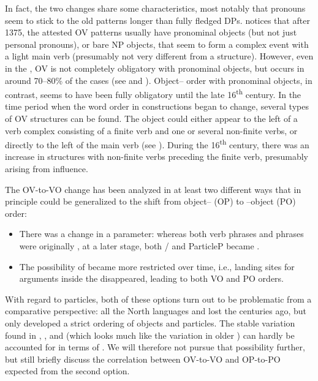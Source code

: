 \documentclass[output=paper]{langscibook}
\begin{document}
In fact, the two changes share some characteristics, most notably that pronouns seem to stick to the old patterns longer than fully fledged DPs. \citet[174]{Delsing1999} notices that after 1375, the attested OV patterns usually have pronominal objects (but not just personal pronouns), or bare NP objects, that seem to form a complex event with a light main verb (presumably not very different from a  structure). However, even in the , OV is not completely obligatory with pronominal objects, but occurs in around 70–80\% of the cases (see \citealt{Delsing1999} and ). Object– order with pronominal objects, in contrast, seems to have been fully obligatory until the late 16\textsuperscript{th} century. In the time period when the word order in  constructions began to change, several types of OV structures can be found. The object could either appear to the left of a verb complex consisting of a finite verb and one or several non-finite verbs, or directly to the left of the main verb (see \citealt{Petzell2011, Petzell2012}). During the 16\textsuperscript{th} century, there was an increase in structures with non-finite verbs preceding the finite verb, presumably arising from  influence.



The OV-to-VO change has been analyzed in at least two different ways that in principle could be generalized to the shift from object– (OP) to –object (PO) order: 


\begin{itemize}
\item There was a change in a  parameter: whereas both verb phrases and  phrases were originally , at a later stage, both / and ParticleP became .
\item The possibility of  became more restricted over time, i.e., landing sites for arguments inside the  disappeared, leading to both VO and PO orders.
\end{itemize}

With regard to particles, both of these options turn out to be problematic from a comparative perspective: all the North  languages and  lost the  centuries ago, but only  developed a strict ordering of objects and particles. The stable variation found in , , and  (which looks much like the variation in older ) can hardly be accounted for in terms of . We will therefore not pursue that possibility further, but still briefly discuss the correlation between OV-to-VO and OP-to-PO expected from the second option.
\end{document}
